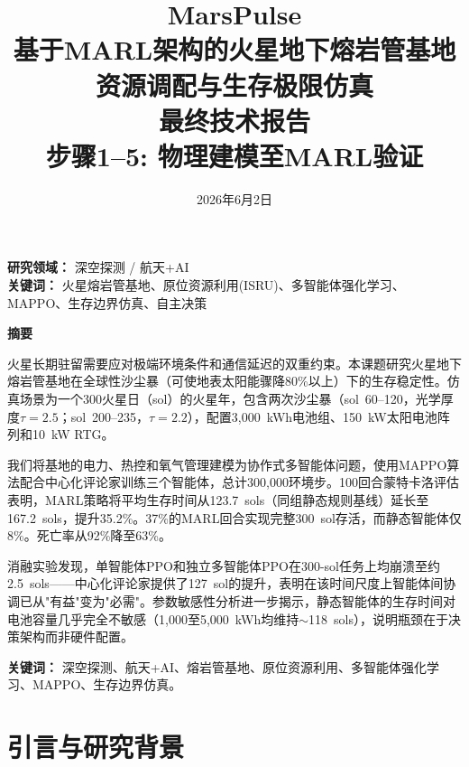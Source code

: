 \documentclass[11pt,a4paper]{ctexart}
\title{
  \vspace{2cm}
  {\huge\textbf{MarsPulse}}\\[8pt]
  {\Large 基于MARL架构的火星地下熔岩管基地资源调配与生存极限仿真}\\[20pt]
  \large 最终技术报告\\[5pt]
  \normalsize 步骤1--5: 物理建模至MARL验证
}
\author{}
\date{2026年6月2日}
\begin{document}
\maketitle
\thispagestyle{empty}

\vspace{3cm}
\begin{center}
  \large
  \textbf{研究领域：} 深空探测 / 航天+AI \\
  \textbf{关键词：} 火星熔岩管基地、原位资源利用(ISRU)、多智能体强化学习、\\
  MAPPO、生存边界仿真、自主决策
\end{center}

\newpage

\begin{center}
  \Large\textbf{摘\quad 要}
\end{center}
\vspace{8pt}

火星长期驻留需要应对极端环境条件和通信延迟的双重约束。本课题研究火星地下熔岩管基地在全球性沙尘暴（可使地表太阳能骤降80\%以上）下的生存稳定性。仿真场景为一个300火星日（sol）的火星年，包含两次沙尘暴（sol~60--120，光学厚度$\tau=2.5$；sol~200--235，$\tau=2.2$），配置3,000~kWh电池组、150~kW太阳电池阵列和10~kW RTG。

我们将基地的电力、热控和氧气管理建模为协作式多智能体问题，使用MAPPO算法配合中心化评论家训练三个智能体，总计300,000环境步。100回合蒙特卡洛评估表明，MARL策略将平均生存时间从123.7~sols（同组静态规则基线）延长至167.2~sols，提升35.2\%。37\%的MARL回合实现完整300~sol存活，而静态智能体仅8\%。死亡率从92\%降至63\%。

消融实验发现，单智能体PPO和独立多智能体PPO在300-sol任务上均崩溃至约2.5~sols——中心化评论家提供了127~sol的提升，表明在该时间尺度上智能体间协调已从"有益"变为"必需"。参数敏感性分析进一步揭示，静态智能体的生存时间对电池容量几乎完全不敏感（1,000至5,000~kWh均维持$\sim$118~sols），说明瓶颈在于决策架构而非硬件配置。

\vspace{10pt}
\noindent\textbf{关键词：} 深空探测、航天+AI、熔岩管基地、原位资源利用、多智能体强化学习、MAPPO、生存边界仿真。

\newpage

\tableofcontents
\newpage

\section{引言与研究背景}
\end{document}
